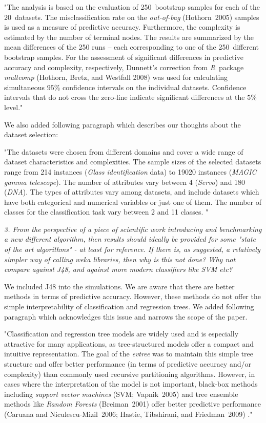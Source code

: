 \documentclass[DIN, pagenumber=false, parskip=half,%
               fromalign=left, fromphone=true,%
               fromemail=true, fromurl=false, %
               fromlogo=true, fromrule=false, fromrule=afteraddress]{scrlttr2}
\begin{document}
"The analysis is based on the evaluation of 250~bootstrap
samples for each of the 20~datasets. The misclassification rate on the
\textit{out-of-bag} (Hothorn~2005) samples is used as a measure of
predictive accuracy. Furthermore, the complexity is estimated by the number of
terminal nodes. The results are summarized by the mean differences of the 250 runs -- each corresponding to
one of the 250~different bootstrap samples. For the assessment of significant differences 
in predictive accuracy and complexity, respectively, 
Dunnett's correction from \textit{R}~package \textit{multcomp} (Hothorn, Bretz, and Westfall 2008) was used
for calculating simultaneous $95\%$ confidence intervals on the individual datasets. Confidence intervals
that do not cross the zero-line indicate significant differences at the $5\%$ level."

We also added following paragraph which describes our thoughts about the dataset selection:

"The datasets were chosen from different domains and cover a wide range of dataset characteristics and complexities. The sample sizes of the selected datasets range from 214 instances (\textit{Glass identification} data) to 19020 instances (\emph{MAGIC gamma telescope}). The number of attributes vary between 4 (\textit{Servo}) and 180 (\emph{DNA}). The types of attributes vary among datasets, and include datasets which have both categorical and numerical variables or just one of them. The number of classes for the classification task vary between 2 and 11 classes. "


\textit{3. From the perspective of  a piece of scientific work introducing 
and benchmarking a new  different algorithm, then results should 
ideally be provided for some "state of the art algorithms" - at 
least for reference.  If there is, as suggested, a relatively 
simpler way of calling weka libraries,  then why is this not 
done?  Why not compare against J48,  and against more modern 
classifiers like SVM etc?}

We included J48 into the simulations. We are aware that there are better methods in terms of predictive accuracy. However, these methods do not offer the simple interpretability of classification and regression trees. We added following paragraph which acknowledges this issue and narrows the scope of the paper.
 
"Classification and regression tree models are widely used and is especially attractive for many applications, as tree-structured
models offer a compact and intuitive representation. The goal of the \textit{evtree} was to maintain this simple tree structure and offer better performance (in terms of predictive accuracy and/or complexity) than commonly used recursive partitioning algorithms. However, in cases where the interpretation of the model is not important, black-box methods including \textit{support vector machines} (SVM; Vapnik~2005) and tree ensemble methods like \textit{Random Forests} (Breiman~2001) offer better predictive performance (Caruana and Niculescu-Mizil~2006;  Hastie, Tibshirani, and Friedman~2009) ."
\end{document}
